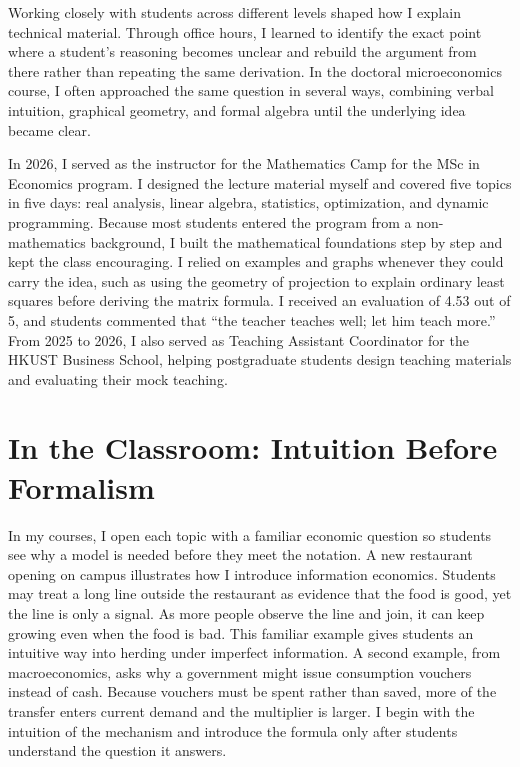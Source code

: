\documentclass[11pt]{article}
\begin{document}
Working closely with students across different levels shaped how I explain technical material. Through office hours, I learned to identify the exact point where a student's reasoning becomes unclear and rebuild the argument from there rather than repeating the same derivation. In the doctoral microeconomics course, I often approached the same question in several ways, combining verbal intuition, graphical geometry, and formal algebra until the underlying idea became clear.

In 2026, I served as the instructor for the Mathematics Camp for the MSc in Economics program. I designed the lecture material myself and covered five topics in five days: real analysis, linear algebra, statistics, optimization, and dynamic programming. Because most students entered the program from a non-mathematics background, I built the mathematical foundations step by step and kept the class encouraging. I relied on examples and graphs whenever they could carry the idea, such as using the geometry of projection to explain ordinary least squares before deriving the matrix formula. I received an evaluation of 4.53 out of 5, and students commented that ``the teacher teaches well; let him teach more.'' From 2025 to 2026, I also served as Teaching Assistant Coordinator for the HKUST Business School, helping postgraduate students design teaching materials and evaluating their mock teaching.

\section*{In the Classroom: Intuition Before Formalism}

In my courses, I open each topic with a familiar economic question so students see why a model is needed before they meet the notation. A new restaurant opening on campus illustrates how I introduce information economics. Students may treat a long line outside the restaurant as evidence that the food is good, yet the line is only a signal. As more people observe the line and join, it can keep growing even when the food is bad. This familiar example gives students an intuitive way into herding under imperfect information. A second example, from macroeconomics, asks why a government might issue consumption vouchers instead of cash. Because vouchers must be spent rather than saved, more of the transfer enters current demand and the multiplier is larger. I begin with the intuition of the mechanism and introduce the formula only after students understand the question it answers.
\end{document}
